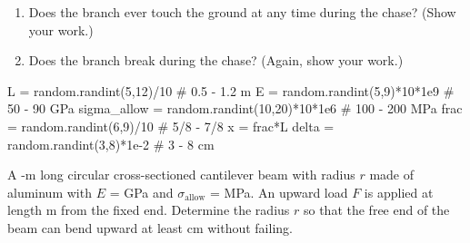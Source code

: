 \documentclass[
fontsize=10pt,
a4paper,
twosides=false,
open=any,
svgnames,
]{kaobook} %
\begin{document}
\begin{exercises}
\begin{enumerate}
\item Does the branch ever touch the ground at any time during the chase? (Show your work.)
\item Does the branch break during the chase? (Again, show your work.)
\end{enumerate}

\begin{pycode}
  L = random.randint(5,12)/10 # 0.5 - 1.2 m
  E = random.randint(5,9)*10*1e9 # 50 - 90 GPa
  sigma_allow = random.randint(10,20)*10*1e6 # 100 - 200 MPa
  frac = random.randint(6,9)/10 # 5/8 - 7/8
  x = frac*L
  delta = random.randint(3,8)*1e-2 # 3 - 8 cm
\end{pycode}

  \item A -m long circular cross-sectioned cantilever beam with radius $r$ made of aluminum with $E$ =  GPa and $\sigma_{\text{allow}}$ =  MPa. An upward load $F$ is applied at length  m from the fixed end. Determine the radius $r$ so that the free end of the beam can bend upward at least  cm without failing.

  \begin{figure}[H]
    \centering
  \end{figure}
  
\end{exercises}

\end{document}
